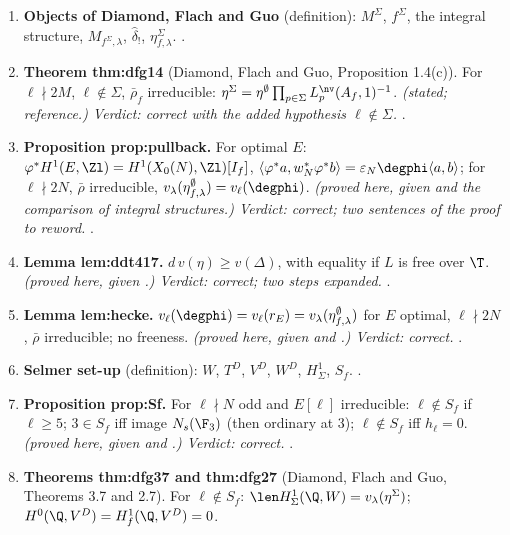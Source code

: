 \begin{sloppypar}
\begin{enumerate}[label=\textbf{\thechapter.\arabic*}]
$\kod{I}_n^*$ ($\ell\mid n$, $q$ odd): then $\ell\mid\deg\varphi_{E_0}$. \emph{(proved here, given  and \cite{ARS12}.) Verdict: correct.} .
\item \textbf{Objects of Diamond, Flach and Guo} (definition): $M^\Sigma$, $f^\Sigma$, the integral structure, $M_{f^\Sigma,\lambda}$, $\hat\delta_!$, $\eta^\Sigma_{f,\lambda}$. .
\item \textbf{Theorem thm:dfg14} (Diamond, Flach and Guo, Proposition 1.4(c)). For $\ell\nmid2M$, $\ell\notin\Sigma$, $\bar\rho_f$ irreducible: $\eta^\Sigma=\eta^\emptyset\prod_{p\in\Sigma}L^{\nv}_p(A_f,1)^{-1}$. \emph{(stated; reference.)
Verdict: correct with the added hypothesis $\ell\notin\Sigma$.} .
\item \textbf{Proposition prop:pullback.} For optimal $E$: $\varphi^*H^1(E,\Zl)=H^1(X_0(N),\Zl)[I_f]$, $\langle\varphi^*a,w_N^*\varphi^*b\rangle=\varepsilon_N\degphi\langle a,b\rangle$; for $\ell\nmid2N$, $\bar\rho$ irreducible,
$v_\lambda(\eta^\emptyset_{f,\lambda})=v_\ell(\degphi)$. \emph{(proved here, given  and the comparison of integral structures.) Verdict: correct; two sentences of the proof to reword.}
.
\item \textbf{Lemma lem:ddt417.} $d\,v(\eta)\ge v(\Delta)$, with equality if $L$ is free over $\T$. \emph{(proved here, given .) Verdict: correct; two steps expanded.} .
\item \textbf{Lemma lem:hecke.} $v_\ell(\degphi)=v_\ell(r_E)=v_\lambda(\eta^\emptyset_{f,\lambda})$ for $E$ optimal, $\ell\nmid2N$, $\bar\rho$ irreducible; no freeness. \emph{(proved here, given \cite{ARS12} and
.) Verdict: correct.} .
\item \textbf{Selmer set-up} (definition): $W$, $T^D$, $V^D$, $W^D$, $H^1_\Sigma$, $S_f$. .
\item \textbf{Proposition prop:Sf.} For $\ell\nmid N$ odd and $E[\ell]$ irreducible: $\ell\notin S_f$ if $\ell\ge5$; $3\in S_f$ iff image $N_s(\F_3)$ (then ordinary at $3$); $\ell\notin S_f$ iff $h_\ell=0$.
\emph{(proved here, given \cite[Section 1]{Serre72} and .) Verdict: correct.} .
\item \textbf{Theorems thm:dfg37 and thm:dfg27} (Diamond, Flach and Guo, Theorems 3.7 and 2.7). For $\ell\notin S_f$: $\len H^1_\Sigma(\Q,W)=v_\lambda(\eta^\Sigma)$; $H^0(\Q,V^D)=H^1_f(\Q,V^D)=0$.

\end{enumerate}
\end{sloppypar}
